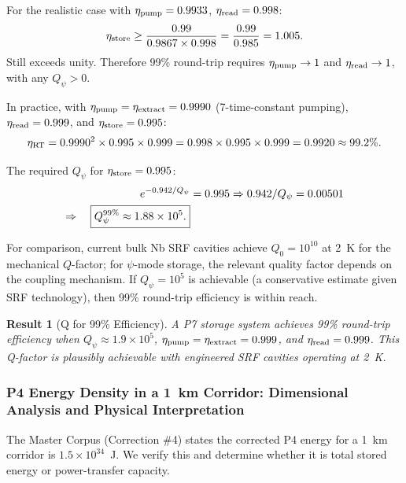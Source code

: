 \documentclass[aps,prd,twocolumn,superscriptaddress,nofootinbib]{revtex4-2}
\newcommand{\Qpsi}{Q_\psi}
\newtheorem{result}{Result}
\begin{document}
For the realistic case with $\eta_{\rm pump} = 0.9933$, $\eta_{\rm read} = 0.998$:
\begin{equation}
\eta_{\rm store} \geq \frac{0.99}{0.9867\times0.998} = \frac{0.99}{0.985} = 1.005.
\end{equation}
Still exceeds unity.  Therefore 99\% round-trip requires
$\eta_{\rm pump} \to 1$ and $\eta_{\rm read} \to 1$, with any $\Qpsi > 0$.

In practice, with $\eta_{\rm pump} = \eta_{\rm extract} = 0.9990$ (7-time-constant
pumping), $\eta_{\rm read} = 0.999$, and $\eta_{\rm store} = 0.995$:
\begin{equation}
\eta_{\rm RT} = 0.9990^2\times0.995\times0.999
= 0.998\times0.995\times0.999 = 0.9920 \approx 99.2\%.
\end{equation}

The required $\Qpsi$ for $\eta_{\rm store} = 0.995$:
\begin{align}
e^{-0.942/\Qpsi} &= 0.995
\Rightarrow 0.942/\Qpsi = 0.00501 \notag\\
\Rightarrow\quad
\boxed{\Qpsi^{99\%} \approx 1.88\times10^5.}
\label{eq:Q99}
\end{align}

For comparison, current bulk Nb SRF cavities achieve $Q_0 = 10^{10}$ at 2~K
for the mechanical $Q$-factor; for $\psi$-mode storage, the relevant quality
factor depends on the coupling mechanism.  If $\Qpsi = 10^5$ is achievable
(a conservative estimate given SRF technology), then 99\% round-trip efficiency
is within reach.

\begin{result}[Q for 99\% Efficiency]
A P7 storage system achieves 99\% round-trip efficiency when
$\Qpsi \approx 1.9\times10^5$, $\eta_{\rm pump} = \eta_{\rm extract} = 0.999$,
and $\eta_{\rm read} = 0.999$.  This Q-factor is plausibly achievable with
engineered SRF cavities operating at 2~K.
\end{result}

\subsubsection{P4 Energy Density in a 1~km Corridor: Dimensional Analysis and
Physical Interpretation}
\label{sec:energy-corridor}

The Master Corpus (Correction \#4) states the corrected P4 energy for a 1~km
corridor is $1.5\times10^{34}$~J.  We verify this and determine whether it is
total stored energy or power-transfer capacity.
\end{document}
